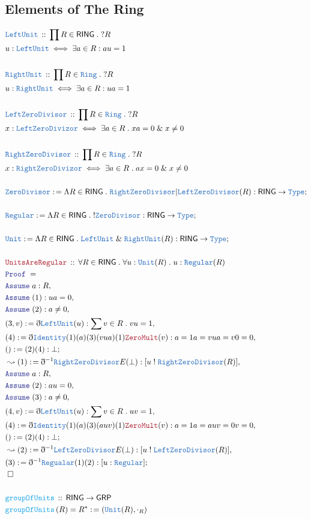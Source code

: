 \documentclass[12pt]{scrartcl}
\newcommand{\TYPE}[1]{\textcolor{NavyBlue}{\mathtt{#1}}}
\newcommand{\FUNC}[1]{\textcolor{Cerulean}{\mathtt{#1}}}
\newcommand{\LOGIC}[1]{\textcolor{Blue}{\mathtt{#1}}}
\newcommand{\THM}[1]{\textcolor{Maroon}{\mathtt{#1}}}
\renewcommand{\.}{\; . \;}
\newcommand{\de}{: \kern 0.1pc =}
\newcommand{\IsNot}{\; ! \;}
\newcommand{\Act}[1]{\left( #1 \right)}
\newcommand{\Theorem}[2]{& \THM{#1} \, :: \, #2 \\ & \Proof = \\ }
\newcommand{\DeclareType}[2]{& \TYPE{#1} \, :: \, #2 \\}
\newcommand{\DefineType}[3]{& #1 : \TYPE{#2} \iff #3 \\}
\newcommand{\DeclareFunc}[2]{& \FUNC{#1} \, :: \, #2 \\}
\newcommand{\DefineNamedFunc}[4]{&  \FUNC{#1}\Act{#2} = #3 \de #4 \\}
\newcommand{\Page}[1]{ \begin{align*} #1 \end{align*}   }
\newcommand{ \bd }{ \ByDef }
\renewcommand{\And}{\; \& \;}
\newcommand{\Type}{\TYPE{Type}}
\newcommand{\Say}[3]{& #1 \de #2 : #3, \\}
\newcommand{\Conclude}[3]{& #1 \de #2 : #3; \\}
\newcommand{\Derive}[3]{& \leadsto #1 \de #2 : #3, \\}
\newcommand{\Assume}[2]{& \LOGIC{Assume} \; #1 : #2, \\}
\newcommand{\QED}{\; \square}
\newcommand{\EndProof}{& \QED \\}
\newcommand{\ByDef}{\eth}
\newcommand{\Proof}{\LOGIC{Proof} \; }
\newcommand{\GRP}{\mathsf{GRP}}
\newcommand{\Ring}{\TYPE{Ring}}
\newcommand{\RING}{\mathsf{RING}}
\begin{document}
\subsection{Elements of The Ring}
\Page{
	\DeclareType{LeftUnit}{\prod R \in \RING \. ?R}
	\DefineType{u}{LeftUnit}{\exists a \in R : au = 1}
	\\
	\DeclareType{RightUnit}{\prod R \in \Ring \. ?R}
	\DefineType{u}{RightUnit}{\exists a \in R : ua = 1 }
	\\
	\DeclareType{LeftZeroDivisor}{ \prod R \in \Ring \. ?R   }
	\DefineType{x}{LeftZeroDivizor}{\exists a \in R \. xa = 0 \And x \neq 0}
	\\
	\DeclareType{RightZeroDivisor}{ \prod R \in \Ring \. ?R   }
	\DefineType{x}{RightZeroDivizor}{\exists a \in R \. ax = 0 \And x \neq 0}
	\\
	\Conclude{\TYPE{ZeroDivisor}}{\Lambda R \in \RING \. \TYPE{RightZeroDivisor} | \TYPE{LeftZeroDivisor}(R)}{\RING \to \Type}
	\\
	\Conclude{ \TYPE{Regular} }{\Lambda R \in \RING \. !\TYPE{ZeroDivisor}}{\RING \to \Type}
	\\
	\Conclude{\TYPE{Unit}}{\Lambda R \in \RING \. \TYPE{LeftUnit} \And \TYPE{RightUnit}(R)}{\RING \to \Type}
	\\
	\Theorem{UnitsAreRegular}{\forall R \in \RING \.   \forall u : \TYPE{Unit}(R) \. u : \TYPE{Regular}(R)}
	\Assume{a}{R}
	\Assume{(1)}{ua = 0}
	\Assume{(2)}{a \neq 0}
	\Say{(3,v)}{\bd \TYPE{LeftUnit}(u)}{\sum v \in R  \.  vu = 1 }
	\Say{(4)}{\bd \TYPE{Identity}(1)(a) (3)(vua)(1)\THM{ZeroMult}(v)}{ a = 1a  = vua = v0 = 0  }
	\Conclude{()}{  (2)(4)  }{\bot}
	\Derive{(1)}{\bd^{-1}\TYPE{RightZeroDivisor}E(\bot)}{[u \IsNot \TYPE{RightZeroDivisor}(R)]}
	\Assume{a}{R}
	\Assume{(2)}{au = 0}
	\Assume{(3)}{a \neq 0}
	\Say{(4,v)}{\bd \TYPE{LeftUnit}(u)}{\sum v \in R  \.  uv = 1 }
	\Say{(4)}{\bd \TYPE{Identity}(1)(a) (3)(auv)(1)\THM{ZeroMult}(v)}{ a = 1a  = auv = 0v = 0  }
	\Conclude{()}{  (2)(4)  }{\bot}
	\Derive{(2)}{\bd^{-1}\TYPE{LeftZeroDivisor}E(\bot)}{[u \IsNot \TYPE{LeftZeroDivisor}(R)]}
	\Conclude{(3) }{\bd^{-1}\TYPE{Regualar}(1)(2)}{ [u : \TYPE{Regular}] }
	\EndProof
	\\
	\DeclareFunc{groupOfUnits}{\RING \to \GRP}
	\DefineNamedFunc{groupOfUnits}{ R }{R^* }{(\TYPE{Unit}(R),\cdot_R)}
}
\end{document}
